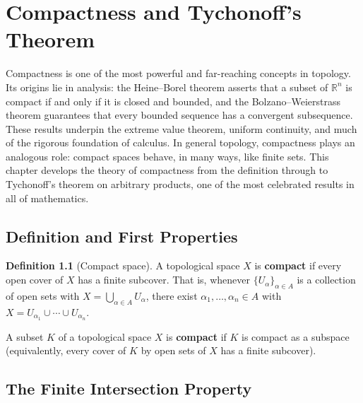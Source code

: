 \documentclass[11pt,a4paper,twoside]{book}
\theoremstyle{remark}
\theoremstyle{definition}
\theoremstyle{definition}
\newtheorem{definition}{Definition}[section]
\begin{document}

\chapter{Compactness and Tychonoff's Theorem}\label{ch:compactness}

Compactness is one of the most powerful and far-reaching concepts in topology.
Its origins lie in analysis: the Heine--Borel theorem asserts that a subset of
$\mathbb{R}^n$ is compact if and only if it is closed and bounded, and the
Bolzano--Weierstrass theorem guarantees that every bounded sequence has a
convergent subsequence.  These results underpin the extreme value theorem,
uniform continuity, and much of the rigorous foundation of calculus.  In
general topology, compactness plays an analogous role: compact spaces behave,
in many ways, like finite sets.  This chapter develops the theory of
compactness from the definition through to Tychonoff's theorem on arbitrary
products, one of the most celebrated results in all of mathematics.

\section{Definition and First Properties}
\label{sec:compactness-def}

\begin{definition}[Compact space]\label{def:compact}
A topological space $X$ is \textbf{compact} if every open cover of $X$ has a
finite subcover.  That is, whenever $\{U_\alpha\}_{\alpha \in A}$ is a
collection of open sets with $X = \bigcup_{\alpha \in A} U_\alpha$, there
exist $\alpha_1, \ldots, \alpha_n \in A$ with
$X = U_{\alpha_1} \cup \cdots \cup U_{\alpha_n}$.

A subset $K$ of a topological space $X$ is \textbf{compact} if $K$ is compact
as a subspace (equivalently, every cover of $K$ by open sets of $X$ has a
finite subcover).
\end{definition}

\section{The Finite Intersection Property}
\label{sec:FIP}
\end{document}
